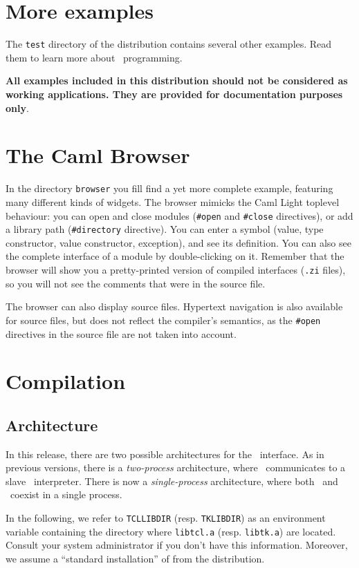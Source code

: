\section{More examples}
The \verb|test| directory of the distribution contains several other
examples. Read them to learn more about \camltk\ programming.


{\bf All examples included in this distribution  should not be considered as
working applications. They are provided for documentation purposes only}.

\section{The Caml Browser}
In the directory {\tt browser} you fill find a yet more complete example,
featuring many different kinds of widgets. The browser mimicks the Caml
Light toplevel behaviour: you can open and close modules ({\tt \#open} and
{\tt \#close} directives), or add a library path ({\tt \#directory} directive).
You can enter a symbol (value, type constructor, value constructor,
exception), and see its definition. You can also see the complete interface
of a module by double-clicking on it. 
Remember that the browser will show you a pretty-printed version
of compiled interfaces ({\tt .zi} files), so you will not see the comments
that were in the source file.

The browser can also display source files. Hypertext navigation is also
available for source files, but does not reflect the compiler's semantics,
as the \verb|#open| directives in the source file are not taken into
account.


\section{Compilation}
\label{sec:compiling}
\subsection{Architecture}
In this release, there are two possible architectures for the \camltk\
interface. As in previous versions, there is a {\em two-process}
architecture, where \caml\ communicates to a slave \wish\ interpreter.
There is now a {\em single-process} architecture, where both \caml\ and \tk\
coexist in a single process.

In the following, we refer to \verb|TCLLIBDIR| (resp. \verb|TKLIBDIR|) as
an environment variable containing the directory where \verb|libtcl.a|
(resp. \verb|libtk.a|) are located. Consult your system administrator if you
don't have this information. Moreover, we assume a ``standard installation''
of \caml from the distribution.

